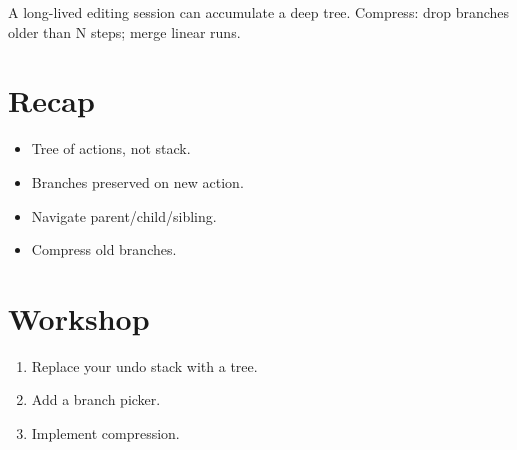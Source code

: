 A long-lived editing session can accumulate a deep tree.
Compress: drop branches older than N steps; merge linear
runs.

\section{Recap}

\begin{recap}
\begin{itemize}[leftmargin=*]
  \item Tree of actions, not stack.
  \item Branches preserved on new action.
  \item Navigate parent/child/sibling.
  \item Compress old branches.
\end{itemize}
\end{recap}

\section*{Workshop}

\begin{enumerate}[leftmargin=*]
  \item Replace your undo stack with a tree.
  \item Add a branch picker.
  \item Implement compression.
\end{enumerate}
